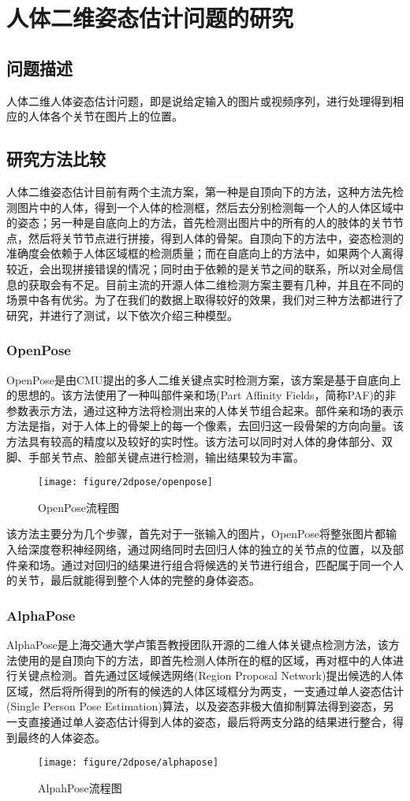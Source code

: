 \section{人体二维姿态估计问题的研究}
\subsection{问题描述}
人体二维人体姿态估计问题，即是说给定输入的图片或视频序列，进行处理得到相应的人体各个关节在图片上的位置。
\subsection{研究方法比较}
人体二维姿态估计目前有两个主流方案，第一种是自顶向下的方法，这种方法先检测图片中的人体，得到一个人体的检测框，然后去分别检测每一个人的人体区域中的姿态；另一种是自底向上的方法，首先检测出图片中的所有的人的肢体的关节节点，然后将关节节点进行拼接，得到人体的骨架。自顶向下的方法中，姿态检测的准确度会依赖于人体区域框的检测质量；而在自底向上的方法中，如果两个人离得较近，会出现拼接错误的情况；同时由于依赖的是关节之间的联系，所以对全局信息的获取会有不足。目前主流的开源人体二维检测方案主要有几种，并且在不同的场景中各有优劣。为了在我们的数据上取得较好的效果，我们对三种方法都进行了研究，并进行了测试，以下依次介绍三种模型。

\subsubsection{OpenPose}
OpenPose是由CMU提出的多人二维关键点实时检测方案，该方案是基于自底向上的思想的。该方法使用了一种叫部件亲和场(Part Affinity Fields，简称PAF)的非参数表示方法，通过这种方法将检测出来的人体关节组合起来。部件亲和场的表示方法是指，对于人体上的骨架上的每一个像素，去回归这一段骨架的方向向量。该方法具有较高的精度以及较好的实时性。该方法可以同时对人体的身体部分、双脚、手部关节点、脸部关键点进行检测，输出结果较为丰富。
\begin{figure}[H]
    \centering
    \texttt{[image: figure/2dpose/openpose]}
    \caption{\label{fig:2d-op} OpenPose流程图}
\end{figure}
该方法主要分为几个步骤，首先对于一张输入的图片，OpenPose将整张图片都输入给深度卷积神经网络，通过网络同时去回归人体的独立的关节点的位置，以及部件亲和场。通过对回归的结果进行组合将候选的关节进行组合，匹配属于同一个人的关节，最后就能得到整个人体的完整的身体姿态。

\subsubsection{AlphaPose}
AlphaPose是上海交通大学卢策吾教授团队开源的二维人体关键点检测方法，该方法使用的是自顶向下的方法，即首先检测人体所在的框的区域，再对框中的人体进行关键点检测。首先通过区域候选网络(Region Proposal Network)提出候选的人体区域，然后将所得到的所有的候选的人体区域框分为两支，一支通过单人姿态估计(Single Person Pose Estimation)算法，以及姿态非极大值抑制算法得到姿态，另一支直接通过单人姿态估计得到人体的姿态，最后将两支分路的结果进行整合，得到最终的人体姿态。
\begin{figure}[H]
    \centering
    \texttt{[image: figure/2dpose/alphapose]}
    \caption{\label{fig:2d-ap} AlpahPose流程图}
\end{figure}

